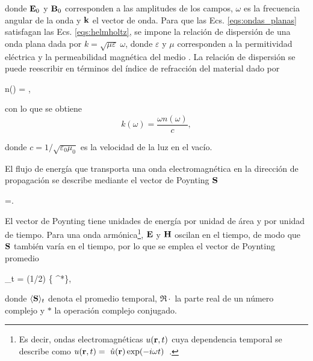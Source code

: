 %
\noindent donde $\vb{E}_0$ y $\vb{B}_0$ corresponden a las amplitudes de los campos, $\omega$ es la frecuencia angular de la onda y $\vb{k}$ el vector de onda. Para que las Ecs. \eqref{eqs:ondas_planas} satisfagan las Ecs. \eqref{eqs:helmholtz}, se impone la relación de dispersión de una onda plana dada por $k=\sqrt{\mu\varepsilon}\;\omega$, donde $\varepsilon$ y $\mu$ corresponden a la permitividad eléctrica y la permeabilidad magnética del medio \cite{jacksonClassicalElectrodynamics2021}. La relación de dispersión se puede reescribir en términos del índice de refracción del material dado por \cite{jacksonClassicalElectrodynamics2021}
\vspace{-0.1cm}
%
\begin{tcolorbox}
	n(\omega) = ,
	\label{eq:indice} 
\end{tcolorbox}
%	
\noindent con lo que se obtiene
%
\begin{equation}
	k(\omega) =\dfrac{\omega n(\omega)}{c},
	\label{eq:numero_onda} 
\end{equation}

\noindent donde $c=1/\sqrt{\varepsilon_0\mu_0}$ es la velocidad de la luz en el vacío.

El flujo de energía que transporta una onda electromagnética en la dirección de propagación se describe mediante el vector de Poynting  $\vb{S}$ \cite{griffithsIntroductionElectrodynamics2023}
\begin{tcolorbox}
	=\times{}.
	\label{eq:vect_Poynting} 
\end{tcolorbox}
\noindent El vector de Poynting tiene unidades de energía por unidad de área y por unidad de tiempo. Para una onda armónica\footnote{Es decir, ondas electromagnéticas $u(\vb{r},t)$ cuya dependencia temporal se describe como $u(\vb{r},t)=~\hat{u}(\vb{r})\,\text{exp}(-i\omega t)$~\cite{zangwillModernElectrodynamics2013}.}, $\vb{E}$ y $\vb{H}$ oscilan en el tiempo, de modo que $\vb{S}$ también varía en el tiempo, por lo que se emplea el vector de Poynting promedio \cite{bohrenAbsorptionScatteringLight2008}
\begin{tcolorbox}
	\langle{}\rangle_t = (1/2) \{ \times {}^*\},
	\label{eq:vect_Poynting_prom_arm} 
\end{tcolorbox}
\noindent donde $	\langle\vb{S}\rangle_t$ denota el promedio temporal, $\Re{\cdot}$ la parte real de un número complejo y $*$ la operación complejo conjugado. 

%
%












